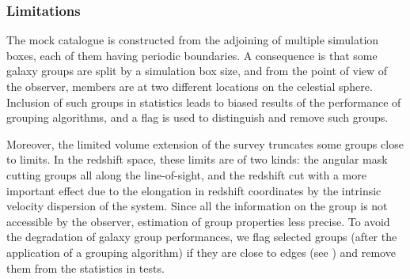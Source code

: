 \subsubsection{Limitations}
\label{ssub:galaxy_samples_limitations}

The mock catalogue is constructed from the adjoining of multiple simulation
boxes, each of them having periodic boundaries. A consequence is that some
galaxy groups are split by a simulation box size, and from the point of view of
the observer, members are at two different locations on the celestial sphere.
Inclusion of such groups in statistics leads to biased results of the
performance of grouping algorithms, and a flag is used to distinguish and
remove such groups.

Moreover, the limited volume extension of the survey truncates some groups
close to limits. In the redshift space, these limits are of two kinds: the
angular mask cutting groups all along the line-of-sight, and the redshift cut
with a more important effect due to the elongation in redshift coordinates by
the intrinsic velocity dispersion of the system. Since all the information on
the group is not accessible by the observer, estimation of group properties
less precise. To avoid the degradation of galaxy group performances, we flag
selected groups (after the application of a grouping algorithm) if they are
close to edges (see ) and remove
them from the statistics in tests.

